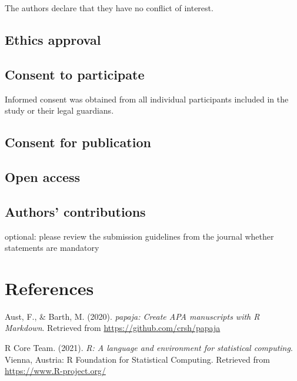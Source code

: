 \documentclass[
  english,
  man,floatsintext]{apa6}
\newlength{\cslhangindent}
\newlength{\cslentryspacingunit} %
\newenvironment{CSLReferences}[2] %
 {%
  \setlength{\parindent}{0pt}
  \ifodd #1
  \let\oldpar\par
  \def\par{\hangindent=\cslhangindent\oldpar}
  \fi
  \setlength{\parskip}{#2\cslentryspacingunit}
 }%
 {}
\begin{document}
The authors declare that they have no conflict of interest.

\hypertarget{ethics-approval}{%
\subsection{Ethics approval}\label{ethics-approval}}

\hypertarget{consent-to-participate}{%
\subsection{Consent to participate}\label{consent-to-participate}}

Informed consent was obtained from all individual participants included in the study or their legal guardians.

\hypertarget{consent-for-publication}{%
\subsection{Consent for publication}\label{consent-for-publication}}

\hypertarget{open-access}{%
\subsection{Open access}\label{open-access}}

\hypertarget{authors-contributions}{%
\subsection{Authors' contributions}\label{authors-contributions}}

optional: please review the submission guidelines from the journal whether statements are mandatory

\newpage

\hypertarget{references}{%
\section{References}\label{references}}

\begingroup
\setlength{\parindent}{-0.5in}
\setlength{\leftskip}{0.5in}

\hypertarget{refs}{}
\begin{CSLReferences}{1}{0}
\leavevmode{}%
Aust, F., \& Barth, M. (2020). \emph{{papaja}: {Create} {APA} manuscripts with {R Markdown}}. Retrieved from \url{https://github.com/crsh/papaja}

\leavevmode{}%
R Core Team. (2021). \emph{R: A language and environment for statistical computing}. Vienna, Austria: R Foundation for Statistical Computing. Retrieved from \url{https://www.R-project.org/}

\end{CSLReferences}
\end{document}
